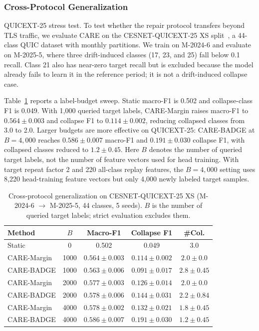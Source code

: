 \documentclass[journal]{IEEEtran}
\newcommand{\ours}{CARE}  %
\begin{document}
\subsubsection{Cross-Protocol Generalization}
\label{sec:cross_protocol}

QUICEXT-25 stress test.
\label{sec:quicext25}
To test whether the repair protocol transfers beyond TLS traffic, we evaluate \ours{} on the CESNET-QUICEXT-25 XS split~\cite{cesnetquicext25,mucke2025waiting}, a 44-class QUIC dataset with monthly partitions.
We train on M-2024-6 and evaluate on M-2025-5, where three drift-induced classes (17, 23, and 25) fall below 0.1 recall.
Class 21 also has near-zero target recall but is excluded because the model already fails to learn it in the reference period; it is not a drift-induced collapse case.

Table~\ref{tab:quicext25} reports a label-budget sweep.
Static macro-F1 is 0.502 and collapse-class F1 is 0.049.
With 1{,}000 queried target labels, \ours{}-Margin raises macro-F1 to $0.564{\pm}0.003$ and collapse F1 to $0.114{\pm}0.002$, reducing collapsed classes from 3.0 to 2.0.
Larger budgets are more effective on QUICEXT-25: \ours{}-BADGE at $B{=}4{,}000$ reaches $0.586{\pm}0.007$ macro-F1 and $0.191{\pm}0.030$ collapse F1, with collapsed classes reduced to $1.2{\pm}0.45$.
Here $B$ denotes the number of queried target labels, not the number of feature vectors used for head training.
With target repeat factor 2 and 220 all-class replay features, the $B{=}4{,}000$ setting uses 8{,}220 head-training feature vectors but only 4{,}000 newly labeled target samples.

\begin{table}[!htbp]
\centering
\caption{Cross-protocol generalization on CESNET-QUICEXT-25 XS (M-2024-6 $\to$ M-2025-5, 44 classes, 5 seeds). $B$ is the number of queried target labels; strict evaluation excludes them.}
\label{tab:quicext25}
\scriptsize
\setlength{\tabcolsep}{3pt}
\begin{tabular}{@{}l c c c c@{}}
\toprule
Method & $B$ & Macro-F1 & Collapse F1 & \#Col. \\
\midrule
Static & 0 & 0.502 & 0.049 & 3.0 \\
\ours{}-Margin & 1000 & $0.564{\pm}0.003$ & $0.114{\pm}0.002$ & $2.0{\pm}0.0$ \\
\ours{}-BADGE & 1000 & $0.563{\pm}0.006$ & $0.091{\pm}0.017$ & $2.8{\pm}0.45$ \\
\ours{}-Margin & 2000 & $0.577{\pm}0.003$ & $0.126{\pm}0.014$ & $2.0{\pm}0.0$ \\
\ours{}-BADGE & 2000 & $0.578{\pm}0.006$ & $0.144{\pm}0.031$ & $2.2{\pm}0.84$ \\
\ours{}-Margin & 4000 & $0.578{\pm}0.002$ & $0.132{\pm}0.021$ & $1.8{\pm}0.45$ \\
\ours{}-BADGE & 4000 & $\mathbf{0.586{\pm}0.007}$ & $\mathbf{0.191{\pm}0.030}$ & $\mathbf{1.2{\pm}0.45}$ \\
\bottomrule
\end{tabular}
\end{table}
\end{document}
